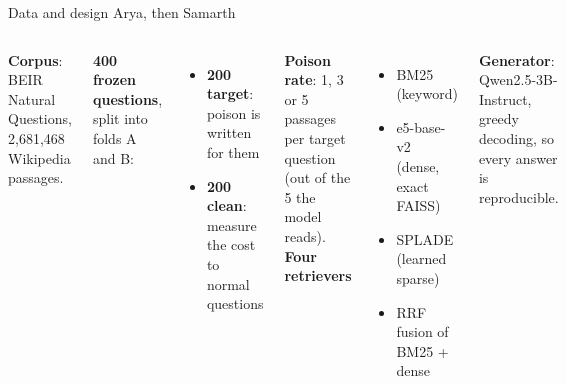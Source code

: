 \documentclass[aspectratio=169,11pt]{beamer}
\newcommand{\who}[1]{\hfill{\normalsize\color{muted}\textmd{#1}}}
\begin{document}
\begin{frame}[t]{Data and design \who{Arya, then Samarth}}
\begin{columns}[T]
\textbf{Corpus}: BEIR Natural Questions, 2,681,468 Wikipedia passages.
\vspace{0.15cm}

\textbf{400 frozen questions}, split into folds A and B:
\begin{itemize}
\item \textbf{200 target}: poison is written for them
\item \textbf{200 clean}: measure the cost to normal questions
\end{itemize}
\vspace{0.1cm}
\textbf{Poison rate}: 1, 3 or 5 passages per target question (out of the 5 the model reads).
\textbf{Four retrievers}
\begin{itemize}
\item BM25 (keyword)
\item e5-base-v2 (dense, exact FAISS)
\item SPLADE (learned sparse)
\item RRF fusion of BM25 + dense
\end{itemize}
\vspace{0.1cm}
\textbf{Generator}: Qwen2.5-3B-Instruct, greedy decoding, so every answer is reproducible.
\end{columns}
\end{frame}
\end{document}
